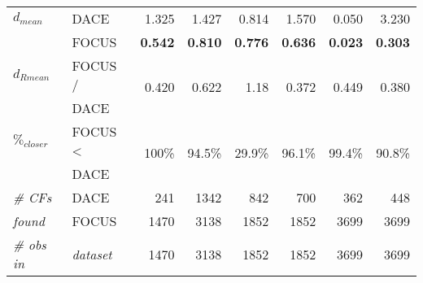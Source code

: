\begin{table*}[h!]
\begin{tabular}{ll@{}rrrrrr}
$d_{mean}$           & DACE              & 1.325                             & {1.427}                              & 0.814                           & 1.570                           & 0.050                           & 3.230                           \\
                & FOCUS             & \textbf{0.542}\rlap{\dubbelneer}                             & \textbf{0.810}\rlap{\dubbelneer}                              & \textbf{0.776}\rlap{\notsig}                           & \textbf{0.636}\rlap{\dubbelneer}                           & \textbf{0.023}\rlap{\dubbelneer}                           & \textbf{0.303}\rlap{\dubbelneer}                           \\ \midrule
$d_{Rmean}$          & FOCUS /           & \multirow{2}{*}{0.420}            & \multirow{2}{*}{0.622}             & \multirow{2}{*}{1.18}          & \multirow{2}{*}{0.372}          & \multirow{2}{*}{0.449}          & \multirow{2}{*}{0.380}          \\
                & DACE              &                                   &                                    &                                 &                                 &                                 &                                 \\ \midrule
$\mathit{\%_{closer}}$          & FOCUS \textless{} & \multirow{2}{*}{100\%}            & \multirow{2}{*}{94.5\%}             & \multirow{2}{*}{29.9\%}          & \multirow{2}{*}{96.1\%}          & \multirow{2}{*}{99.4\%}          & \multirow{2}{*}{90.8\%}          \\
                & DACE              &                                   &                                    &                                 &                                 &                                 &                                 \\ 
\midrule
 \textit{\# CFs}        & DACE              & 241                               & 1342                               & 842                             & 700                             & 362                             & 448                             \\
  \textit{found}              & FOCUS             & 1470                              & 3138                               & 1852                            & 1852                            & 3699                            & 3699                            \\ \midrule 
                
   \textit{\# obs      in}	& \textit{dataset}	& 1470                              & 3138                               & 1852                            & 1852                            & 3699                            & 3699                            \\ \bottomrule
\end{tabular}
\label{table:experiment2}
\end{table*}